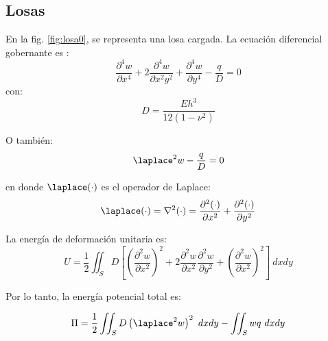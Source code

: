 \subsection{Losas}

En la fig. \ref{fig:losa0}, se representa una losa cargada. La ecuación diferencial gobernante es \cite{timoshenko1959theory}:
\begin{equation}
	 \dfrac{\partial^4 w}{\partial x^4} + 2\dfrac{\partial^4 w}{\partial x^2y^2} + \dfrac{\partial^4 w}{\partial y^4} - \dfrac{q}{D} = 0
\end{equation}
con:
\begin{equation}
	D = \dfrac{Eh^3}{12 (1 - \nu^2)}
\end{equation}

O también:
\begin{equation}
	\laplace^2 w - \dfrac{q}{D} = 0
\end{equation}

en donde $\laplace (\cdot)$ es el operador de Laplace:
\begin{equation}
	\laplace (\cdot) = \nabla^2 (\cdot) = \dfrac{\partial^2 (\cdot)}{\partial x^2} + \dfrac{\partial^2 (\cdot)}{\partial y^2}
\end{equation}

La energía de deformación unitaria es:
\begin{equation}
	U = \frac{1}{2} \iint_S D \left[ \left( \frac{\partial^2 w}{\partial x^2} \right)^2 + 2 \frac{\partial^2 w}{\partial x^2} \frac{\partial^2 w}{\partial y^2} + \left( \frac{\partial^2 w}{\partial x^2} \right)^2 \right] \ dx dy
\end{equation}

Por lo tanto, la energía potencial total es:

\begin{equation}
	\Pi = \frac{1}{2} \iint_S D \left( \laplace^2 w \right)^2 \ dx dy - \iint_S w q \ dx dy
\end{equation}
